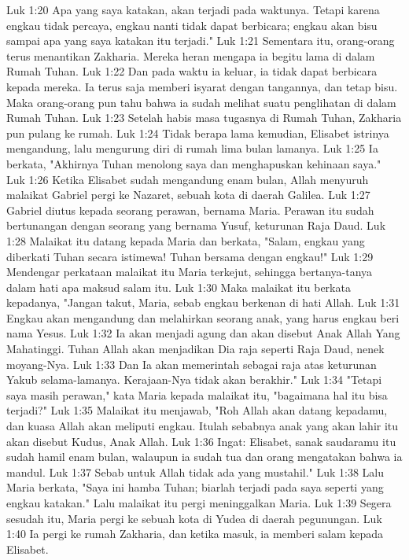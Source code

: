Luk 1:20  Apa yang saya katakan, akan terjadi pada waktunya. Tetapi karena engkau tidak percaya, engkau nanti tidak dapat berbicara; engkau akan bisu sampai apa yang saya katakan itu terjadi."
Luk 1:21  Sementara itu, orang-orang terus menantikan Zakharia. Mereka heran mengapa ia begitu lama di dalam Rumah Tuhan.
Luk 1:22  Dan pada waktu ia keluar, ia tidak dapat berbicara kepada mereka. Ia terus saja memberi isyarat dengan tangannya, dan tetap bisu. Maka orang-orang pun tahu bahwa ia sudah melihat suatu penglihatan di dalam Rumah Tuhan.
Luk 1:23  Setelah habis masa tugasnya di Rumah Tuhan, Zakharia pun pulang ke rumah.
Luk 1:24  Tidak berapa lama kemudian, Elisabet istrinya mengandung, lalu mengurung diri di rumah lima bulan lamanya.
Luk 1:25  Ia berkata, "Akhirnya Tuhan menolong saya dan menghapuskan kehinaan saya."
Luk 1:26  Ketika Elisabet sudah mengandung enam bulan, Allah menyuruh malaikat Gabriel pergi ke Nazaret, sebuah kota di daerah Galilea.
Luk 1:27  Gabriel diutus kepada seorang perawan, bernama Maria. Perawan itu sudah bertunangan dengan seorang yang bernama Yusuf, keturunan Raja Daud.
Luk 1:28  Malaikat itu datang kepada Maria dan berkata, "Salam, engkau yang diberkati Tuhan secara istimewa! Tuhan bersama dengan engkau!"
Luk 1:29  Mendengar perkataan malaikat itu Maria terkejut, sehingga bertanya-tanya dalam hati apa maksud salam itu.
Luk 1:30  Maka malaikat itu berkata kepadanya, "Jangan takut, Maria, sebab engkau berkenan di hati Allah.
Luk 1:31  Engkau akan mengandung dan melahirkan seorang anak, yang harus engkau beri nama Yesus.
Luk 1:32  Ia akan menjadi agung dan akan disebut Anak Allah Yang Mahatinggi. Tuhan Allah akan menjadikan Dia raja seperti Raja Daud, nenek moyang-Nya.
Luk 1:33  Dan Ia akan memerintah sebagai raja atas keturunan Yakub selama-lamanya. Kerajaan-Nya tidak akan berakhir."
Luk 1:34  "Tetapi saya masih perawan," kata Maria kepada malaikat itu, "bagaimana hal itu bisa terjadi?"
Luk 1:35  Malaikat itu menjawab, "Roh Allah akan datang kepadamu, dan kuasa Allah akan meliputi engkau. Itulah sebabnya anak yang akan lahir itu akan disebut Kudus, Anak Allah.
Luk 1:36  Ingat: Elisabet, sanak saudaramu itu sudah hamil enam bulan, walaupun ia sudah tua dan orang mengatakan bahwa ia mandul.
Luk 1:37  Sebab untuk Allah tidak ada yang mustahil."
Luk 1:38  Lalu Maria berkata, "Saya ini hamba Tuhan; biarlah terjadi pada saya seperti yang engkau katakan." Lalu malaikat itu pergi meninggalkan Maria.
Luk 1:39  Segera sesudah itu, Maria pergi ke sebuah kota di Yudea di daerah pegunungan.
Luk 1:40  Ia pergi ke rumah Zakharia, dan ketika masuk, ia memberi salam kepada Elisabet.
